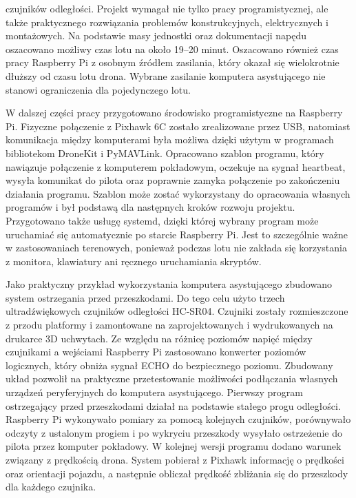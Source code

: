 \documentclass[a4paper,12pt]{book}
\begin{document}
    czujników odległości. Projekt wymagał nie tylko pracy programistycznej, ale także praktycznego rozwiązania problemów konstrukcyjnych, elektrycznych i montażowych.
    Na podstawie masy jednostki oraz dokumentacji napędu oszacowano możliwy czas lotu na około 19–20 minut. Oszacowano również czas pracy Raspberry Pi z osobnym źródłem zasilania, 
    który okazał się wielokrotnie dłuższy od czasu lotu drona. Wybrane zasilanie komputera asystującego nie stanowi ograniczenia dla pojedynczego lotu.\par
    W dalszej części pracy przygotowano środowisko programistyczne na Raspberry Pi. Fizyczne połączenie z Pixhawk 6C zostało zrealizowane przez USB, natomiast komunikacja między 
    komputerami była możliwa dzięki użytym w programach bibliotekom DroneKit i PyMAVLink. 
    Opracowano szablon programu, który nawiązuje połączenie z komputerem pokładowym, oczekuje na sygnał heartbeat, wysyła komunikat do pilota oraz poprawnie zamyka połączenie 
    po zakończeniu działania programu. Szablon może zostać wykorzystany do opracowania własnych programów i był podstawą dla następnych kroków rozwoju projektu. 
    Przygotowano także usługę systemd, dzięki której wybrany program może uruchamiać się automatycznie po starcie Raspberry Pi. 
    Jest to szczególnie ważne w zastosowaniach terenowych, ponieważ podczas lotu nie zakłada się korzystania z monitora, klawiatury ani ręcznego uruchamiania skryptów.\par
    Jako praktyczny przykład wykorzystania komputera asystującego zbudowano system ostrzegania przed przeszkodami. Do tego celu użyto trzech ultradźwiękowych czujników odległości 
    HC-SR04. Czujniki zostały rozmieszczone z przodu platformy i zamontowane na zaprojektowanych i wydrukowanych na drukarce 3D uchwytach. Ze względu na różnicę poziomów napięć 
    między czujnikami a wejściami Raspberry Pi zastosowano konwerter poziomów logicznych, który obniża sygnał ECHO do bezpiecznego poziomu. Zbudowany układ pozwolił na praktyczne 
    przetestowanie możliwości podłączania własnych urządzeń peryferyjnych do komputera asystującego.
    Pierwszy program ostrzegający przed przeszkodami działał na podstawie stałego progu odległości. Raspberry Pi wykonywało pomiary za pomocą kolejnych czujników, porównywało odczyty 
    z ustalonym progiem i po wykryciu przeszkody wysyłało ostrzeżenie do pilota przez komputer pokładowy. W kolejnej wersji programu dodano warunek związany z prędkością drona. 
    System pobierał z Pixhawk informację o prędkości oraz orientacji pojazdu, a następnie obliczał prędkość zbliżania się do przeszkody dla każdego czujnika. 
\end{document}
